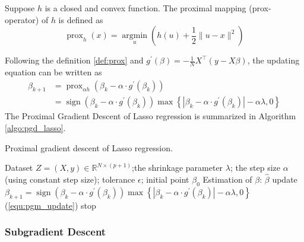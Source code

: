 \documentclass[11pt,en,authoryear]{elegantpaper}
\numberwithin{equation}{section}
\newcommand{\mbR}{\mathbb{R}}
\begin{document}
\begin{definition}\label{def:prox}
Suppose $h$ is a closed and convex function. The proximal mapping (prox-operator)
of $h$ is defined as
\begin{equation}
\operatorname{prox}_{h}(x)=\underset{u}{\operatorname{argmin}}(h(u)+\frac{1}{2}\|u-x\|^{2})
\end{equation}
\end{definition}
\noindent
Following the definition \ref{def:prox} and $g^{\prime}(\beta) = -\frac{1}{N}X^{\top}(y - X\beta)$, the updating equation can be written as 
\begin{equation}\label{equ:pgm_update}
    \begin{aligned}
    \beta_{k+1} &= \operatorname{prox}_{\alpha h}\left(\beta_k - \alpha \cdot g^{\prime}(\beta_k) \right) \\
    &= \operatorname{sign}(\beta_k - \alpha \cdot g^{\prime}(\beta_k)) \max \left\{|\beta_k - \alpha \cdot g^{\prime}(\beta_k)|-\alpha \lambda, 0\right\}
    \end{aligned}
\end{equation}
The Proximal Gradient Descent of Lasso regression is summarized in Algorithm \ref{algo:pgd_lasso}.

\begin{center}
\begin{minipage}{13.5cm}
	  \begin{algorithm}[H]
  \caption{Proximal gradient descent of Lasso regression.}\label{algo:pgd_lasso}
  \begin{algorithmic}[1]
    \Require
      Dataset $Z = (X, y) \in \mbR^{N \times (p+1)}$;the shrinkage parameter $\lambda$;  the step size $\alpha$ (using constant step size); tolerance $\epsilon$; initial point $\beta_0$
    \Ensure Estimation of $\beta$: $\hat{\beta}$
    {
    \State update $\beta_{k+1} = \operatorname{sign}(\beta_k - \alpha \cdot g^{\prime}(\beta_k)) \max \left\{|\beta_k - \alpha \cdot g^{\prime}(\beta_k)|-\alpha \lambda, 0\right\}$ \quad (\ref{equ:pgm_update})
    \State stop
    \EndIf
    }
    \EndFor
  \end{algorithmic}
\end{algorithm}
\end{minipage}
\end{center}



\subsubsection{Subgradient Descent}
\end{document}
